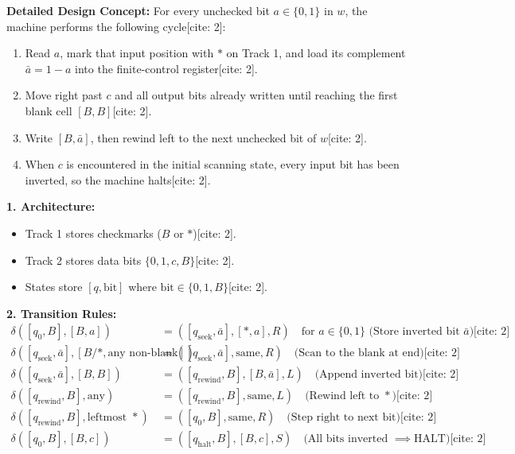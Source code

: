 \documentclass[11pt,a4paper]{article}
\begin{document}
\begin{solutionbox}
\textbf{Detailed Design Concept:}
For every unchecked bit $a\in\{0,1\}$ in $w$, the machine performs the following cycle[cite: 2]:
\begin{enumerate}[leftmargin=*]
    \item Read $a$, mark that input position with $*$ on Track 1, and load its complement $\bar a=1-a$ into the finite-control register[cite: 2].
    \item Move right past $c$ and all output bits already written until reaching the first blank cell $[B,B]$[cite: 2].
    \item Write $[B,\bar a]$, then rewind left to the next unchecked bit of $w$[cite: 2].
    \item When $c$ is encountered in the initial scanning state, every input bit has been inverted, so the machine halts[cite: 2].
\end{enumerate}

\textbf{1. Architecture:}
\begin{itemize}[leftmargin=*]
    \item Track 1 stores checkmarks ($B$ or $*$)[cite: 2].
    \item Track 2 stores data bits $\{0, 1, c, B\}$[cite: 2].
    \item States store $[q, \text{bit}]$ where $\text{bit} \in \{0, 1, B\}$[cite: 2].
\end{itemize}

\textbf{2. Transition Rules:}
\begin{align*}
\delta([q_0, B], [B, a]) &= ([q_{\text{seek}}, \bar{a}], [*, a], R) \quad \text{for } a \in \{0, 1\} \text{ (Store inverted bit } \bar{a}\text{)} \text{[cite: 2]} \\
\delta([q_{\text{seek}}, \bar{a}], [B/*, \text{any non-blank}]) &= ([q_{\text{seek}}, \bar{a}], \text{same}, R) \quad \text{(Scan to the blank at end)} \text{[cite: 2]} \\
\delta([q_{\text{seek}}, \bar{a}], [B, B]) &= ([q_{\text{rewind}}, B], [B, \bar{a}], L) \quad \text{(Append inverted bit)} \text{[cite: 2]} \\
\delta([q_{\text{rewind}}, B], \text{any}) &= ([q_{\text{rewind}}, B], \text{same}, L) \quad \text{(Rewind left to } * \text{)} \text{[cite: 2]} \\
\delta([q_{\text{rewind}}, B], \text{leftmost } *) &= ([q_0, B], \text{same}, R) \quad \text{(Step right to next bit)} \text{[cite: 2]} \\
\delta([q_0, B], [B, c]) &= ([q_{\text{halt}}, B], [B, c], S) \quad \text{(All bits inverted } \implies \text{HALT)} \text{[cite: 2]}
\end{align*}


\end{solutionbox}
\end{document}
